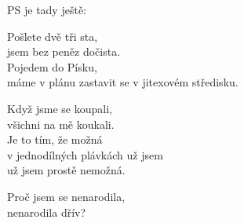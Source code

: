 \cho{}

\ve{}
PS je tady ještě:

Pošlete dvě tři sta,\\
jsem bez peněz dočista.\\
Pojedem do Písku,\\
máme v plánu zastavit se v jitexovém středisku.

\ve{}
Když jsme se koupali,\\
všichni na mě koukali.\\
Je to tím, že možná\\
v jednodílných plávkách už jsem\\
už jsem prostě nemožná.

\re{}
Proč jsem se nenarodila,\\
nenarodila dřív?

\esong{}